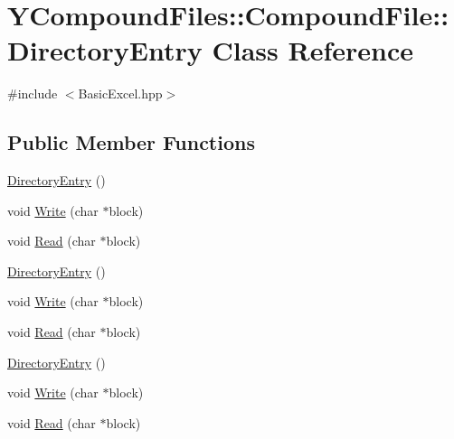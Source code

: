 \hypertarget{class_y_compound_files_1_1_compound_file_1_1_directory_entry}{}\section{Y\+Compound\+Files\+:\+:Compound\+File\+:\+:Directory\+Entry Class Reference}
\label{class_y_compound_files_1_1_compound_file_1_1_directory_entry}


{\ttfamily \#include $<$Basic\+Excel.\+hpp$>$}

\subsection*{Public Member Functions}
\begin{DoxyCompactItemize}
\item 
\hyperlink{class_y_compound_files_1_1_compound_file_1_1_directory_entry_ab001d31c70e9e89bc5d9afc7485fc2cc}{Directory\+Entry} ()
\item 
void \hyperlink{class_y_compound_files_1_1_compound_file_1_1_directory_entry_a01a4e84aaec1a28ab42afd10c3600a72}{Write} (char $\ast$block)
\item 
void \hyperlink{class_y_compound_files_1_1_compound_file_1_1_directory_entry_a82d3f0364760444ba70fbdb76fc8be73}{Read} (char $\ast$block)
\item 
\hyperlink{class_y_compound_files_1_1_compound_file_1_1_directory_entry_ab001d31c70e9e89bc5d9afc7485fc2cc}{Directory\+Entry} ()
\item 
void \hyperlink{class_y_compound_files_1_1_compound_file_1_1_directory_entry_a01a4e84aaec1a28ab42afd10c3600a72}{Write} (char $\ast$block)
\item 
void \hyperlink{class_y_compound_files_1_1_compound_file_1_1_directory_entry_a82d3f0364760444ba70fbdb76fc8be73}{Read} (char $\ast$block)
\item 
\hyperlink{class_y_compound_files_1_1_compound_file_1_1_directory_entry_ab001d31c70e9e89bc5d9afc7485fc2cc}{Directory\+Entry} ()
\item 
void \hyperlink{class_y_compound_files_1_1_compound_file_1_1_directory_entry_a01a4e84aaec1a28ab42afd10c3600a72}{Write} (char $\ast$block)
\item 
void \hyperlink{class_y_compound_files_1_1_compound_file_1_1_directory_entry_a82d3f0364760444ba70fbdb76fc8be73}{Read} (char $\ast$block)
\end{DoxyCompactItemize}
